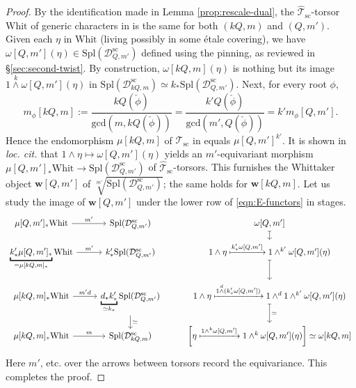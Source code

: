 \documentclass[a4paper,10pt]{article}
\begin{document}
\begin{proof}
	By the identification made in Lemma \ref{prop:rescale-dual}, the $\hat{\mathcal{T}}_\text{sc}$-torsor $\text{Whit}$ of generic characters in \cite[\S 3.3]{Weis17} is the same for both $(kQ,m)$ and $(Q, m')$. Given each $\eta$ in $\text{Whit}$ (living possibly in some étale covering), we have $\omega[Q, m'](\eta) \in \text{Spl}(\mathcal{D}_{Q, m'}^\text{sc})$ defined using the pinning, as reviewed in \S\ref{sec:second-twist}. By construction, $\omega[kQ, m](\eta)$ is nothing but its image $1 \overset{k}{\wedge} \omega[Q, m'](\eta)$ in $\text{Spl}(\mathcal{D}_{kQ, m}^\text{sc}) \simeq k_* \text{Spl}(\mathcal{D}_{Q, m'}^\text{sc})$. Next, for every root $\phi$,
	\[ m_\phi[kQ, m] := \dfrac{kQ(\check{\phi})}{\text{gcd}(m, kQ(\check{\phi}))} = \dfrac{k'Q(\check{\phi})}{\text{gcd}(m', Q(\check{\phi}))} = k' m_\phi[Q, m']. \]
	Hence the endomorphism $\mu[kQ, m]$ of $\hat{\mathcal{T}}_\text{sc}$ in \cite[\S 3.3]{Weis17} equals $\mu[Q, m']^{k'}$. It is shown in \textit{loc. cit.} that $1 \wedge \eta \mapsto \omega[Q, m'](\eta)$ yields an $m'$-equivariant morphism $\mu[Q, m']_* \text{Whit} \to \text{Spl}(\mathcal{D}^\text{sc}_{Q,m'})$ of $\hat{\mathcal{T}}_\text{sc}$-torsors. This furnishes the Whittaker object $\bm{w}[Q, m']$ of $\sqrt[m']{\text{Spl}(\mathcal{D}^\text{sc}_{Q,m'})}$; the same holds for $\bm{w}[kQ, m]$. Let us study the image of $\bm{w}[Q, m']$ under the lower row of \eqref{eqn:E-functors} in stages.
	\[\begin{tikzcd}[row sep=small]
		\mu[Q,m']_* \text{Whit} \arrow{r}{m'} & \text{Spl}(\mathcal{D}^\text{sc}_{Q, m'}) & \omega[Q, m'] \arrow[mapsto]{d} \\
		\underbracket{k'_* \mu[Q,m']_*}_{= \mu[kQ, m]_*} \text{Whit} \arrow{r}{m'} & k'_* \text{Spl}(\mathcal{D}^\text{sc}_{Q, m'}) & 1 \wedge \eta \xmapsto{k'_* \omega[Q, m']} 1 \wedge^{k'} \omega[Q, m'](\eta) \arrow[mapsto]{d} \\
		\mu[kQ, m]_* \text{Whit} \arrow{r}{m'd} & \underbracket{d_* k'_*}_{\simeq k_*} \text{Spl}(\mathcal{D}^\text{sc}_{Q, m'}) \arrow{d}{\simeq} & 1 \wedge \eta \xmapsto{1 \overset{d}{\wedge} (k'_* \omega[Q, m'])} 1 \wedge^{d} 1 \wedge^{k'} \omega[Q, m'](\eta) \arrow[mapsto]{d}{\simeq} \\
		\mu[kQ, m]_* \text{Whit} \arrow{r}{m} & \text{Spl}(\mathcal{D}^\text{sc}_{kQ, m}) &  \left[ \eta \xmapsto{1 \wedge^k \omega[Q, m']} 1 \wedge^k \omega[Q, m'](\eta) \right] \simeq \omega[kQ, m]
	\end{tikzcd}\]
	Here $m'$, etc. over the arrows between torsors record the equivariance. This completes the proof.
\end{proof}
\end{document}
